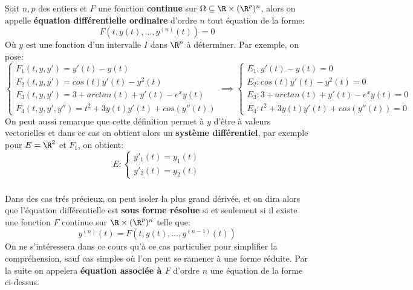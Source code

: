 \chapter*{}
Soit \(n, p\) des entiers et \(F\) une fonction \textbf{continue} sur \(\Omega \subseteq \R \times (\R^{p})^n\), alors on appelle \textbf{équation différentielle ordinaire} d'ordre \(n\) tout équation de la forme:
\[
   F(t, y(t), \ldots, y^{(n)}(t)) = 0
\]
Où \(y\) est une fonction d'un intervalle \( I \) dans \(\R^p\) à déterminer. Par exemple, on pose:
\[
   \begin{cases}
      F_1(t, y, y') = y'(t) - y(t)\\
      F_2(t, y, y') = cos(t)y'(t) - y^2(t)\\
      F_3(t, y, y') = 3 + arctan(t) + y'(t) - e^xy(t)\\ 
      F_4(t, y, y', y'') = t^2 + 3y(t)y'(t) + cos(y''(t))
   \end{cases} \implies
   \begin{cases}
      E_1 : y'(t) - y(t) = 0 \\
      E_2 : cos(t)y'(t) - y^2(t) = 0 \\
      E_3 : 3 + arctan(t) + y'(t) - e^xy(t) = 0 \\
      E_4 : t^2 + 3y(t)y'(t) + cos(y''(t)) = 0
   \end{cases}
\]
On peut aussi remarque que cette définition permet à \(y\) d'être à valeurs vectorielles et dans ce cas on obtient alors un \textbf{système différentiel}, par exemple pour \(E = \R^2\) et \(F_1\), on obtient:
\[
   E : \begin{cases}
      y'_1(t) = y_1(t)\\
      y'_2(t) = y_2(t)
   \end{cases}
\]
\subsection*{}
Dans des cas trés précieux, on peut isoler la plus grand dérivée, et on dira alors que l'équation différentielle est \textbf{sous forme résolue} si et seulement si il existe une fonction \(F\) continue sur \(\R \times (\R^p)^{n}\) telle que:
\[
   y^{(n)}(t) = F(t, y(t), \ldots, y^{(n-1)}(t))
\]
On ne s'intéressera dans ce cours qu'à ce cas particulier pour simplifier la compréhension, sauf cas simples où l'on peut se ramener à une forme réduite. Par la suite on appelera \textbf{équation associée à \( F \)} d'ordre \( n \) une équation de la forme ci-dessus.
